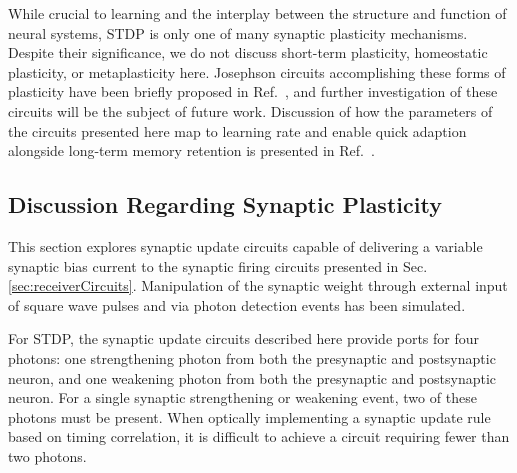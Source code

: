 \documentclass[twocolumn]{article}
\newcommand{\onlinecite}[1]{\hspace{-1 ex} \nocite{#1}\citenum{#1}}
\begin{document}
While crucial to learning and the interplay between the structure and function of neural systems, STDP is only one of many synaptic plasticity mechanisms. Despite their significance, we do not discuss short-term plasticity, homeostatic plasticity, or metaplasticity here. Josephson circuits accomplishing these forms of plasticity have been briefly proposed in Ref.\,\onlinecite{sh2018c}, and further investigation of these circuits will be the subject of future work. Discussion of how the parameters of the circuits presented here map to learning rate and enable quick adaption alongside long-term memory retention is presented in Ref.\,\onlinecite{sh2018c}.
	
\subsection{\label{sec:discussion_synapticPlasticity}Discussion Regarding Synaptic Plasticity}
This section explores synaptic update circuits capable of delivering a variable synaptic bias current to the synaptic firing circuits presented in Sec.\,\ref{sec:receiverCircuits}. Manipulation of the synaptic weight through external input of square wave pulses and via photon detection events has been simulated. 

For STDP, the synaptic update circuits described here provide ports for four photons: one strengthening photon from both the pre\textendash synaptic and post\textendash synaptic neuron, and one weakening photon from both the pre\textendash synaptic and post\textendash synaptic neuron. For a single synaptic strengthening or weakening event, two of these photons must be present. When optically implementing a synaptic update rule based on timing correlation, it is difficult to achieve a circuit requiring fewer than two photons.
\end{document}
